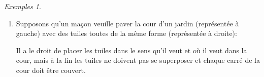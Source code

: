 \documentclass[french,a4paper]{article}
\theoremstyle{definition}
\theoremstyle{remark}
\newtheorem*{examples}{Exemples}
\begin{document}
\begin{examples}
\begin{enumerate}[label=(\arabic*)]
    la contrainte au sens courant du terme: par exemple,
    \begin{displaymath}
      \begin{aligned}
        (\mathrm{Alice},\mathrm{oignons},\mathrm{supermarché})
        &\mathrel{\mathcal S} A, \\
        (\mathrm{Alice},\mathrm{carottes},\mathrm{supermarché})
        &\mathrel{\not \kern-2pt\mathcal S} C_1, \\
        (\mathrm{Bob},\mathrm{pommes\ de\ terre},\mathrm{épicier})
        &\mathrel{\mathcal S} C_4, \quad\text{etc.}
      \end{aligned}
    \end{displaymath}
    Dans le cas présent (et dans la plupart des puzzles de ce genre),
    il y a une unique solution au problème de satisfaction de
    contraintes.
  \item Supposons qu'un maçon veuille paver la cour d'un jardin
    (représentée à gauche) avec des tuiles toutes de la même forme
    (représentée à droite):

    \begin{minipage}{.68\textwidth}\centering
    \end{minipage}
    \begin{minipage}{.3\textwidth}\flushleft
    \end{minipage}

    Il a le droit de placer les tuiles dans le sens qu'il veut et où
    il veut dans la cour, mais à la fin les tuiles ne doivent pas se
    superposer et chaque carré de la cour doit être couvert.
    

\end{enumerate}
\end{examples}
\end{document}

